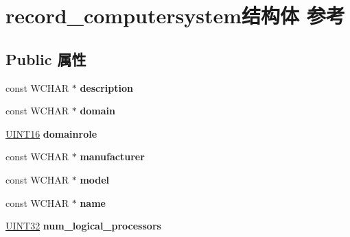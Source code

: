 \hypertarget{structrecord__computersystem}{}\section{record\+\_\+computersystem结构体 参考}
\label{structrecord__computersystem}
\subsection*{Public 属性}
\begin{DoxyCompactItemize}
\item 
\mbox{\label{structrecord__computersystem_a09cd85c0c90129836c5d5c4ffdcfb0c2}} 
const W\+C\+H\+AR $\ast$ {\bfseries description}
\item 
\mbox{\label{structrecord__computersystem_a3c78208f0f26d4cd2660022e9085d02b}} 
const W\+C\+H\+AR $\ast$ {\bfseries domain}
\item 
\mbox{\label{structrecord__computersystem_a8544861f8cd15563218dd76363497401}} 
\hyperlink{_processor_bind_8h_a09f1a1fb2293e33483cc8d44aefb1eb1}{U\+I\+N\+T16} {\bfseries domainrole}
\item 
\mbox{\label{structrecord__computersystem_a1c6b20921e85e4b6366106193029b8f5}} 
const W\+C\+H\+AR $\ast$ {\bfseries manufacturer}
\item 
\mbox{\label{structrecord__computersystem_a77351eb792b3a9eb985de4a53d22a5b6}} 
const W\+C\+H\+AR $\ast$ {\bfseries model}
\item 
\mbox{\label{structrecord__computersystem_a97e3bee4b54a95d574195e265b6cce07}} 
const W\+C\+H\+AR $\ast$ {\bfseries name}
\item 
\mbox{\label{structrecord__computersystem_a605864f29ebcd44753a9c137a55b38b2}} 
\hyperlink{_processor_bind_8h_ae1e6edbbc26d6fbc71a90190d0266018}{U\+I\+N\+T32} {\bfseries num\+\_\+logical\+\_\+processors}
\item 
\mbox{\label{structrecord__computersystem_afc79881aeee55d79618a0d3ba30cd783}} 

\end{DoxyCompactItemize}
